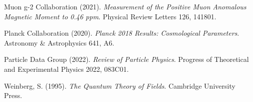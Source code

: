 \documentclass[12pt,a4paper]{report}
\begin{document}
\begin{thebibliography}{99}
		Muon g-2 Collaboration (2021). \textit{Measurement of the Positive Muon Anomalous Magnetic Moment to 0.46 ppm}. Physical Review Letters 126, 141801.
		
		Planck Collaboration (2020). \textit{Planck 2018 Results: Cosmological Parameters}. Astronomy \& Astrophysics 641, A6.
		
		Particle Data Group (2022). \textit{Review of Particle Physics}. Progress of Theoretical and Experimental Physics 2022, 083C01.
		
		Weinberg, S. (1995). \textit{The Quantum Theory of Fields}. Cambridge University Press.
	\end{thebibliography}
	
\end{document}
